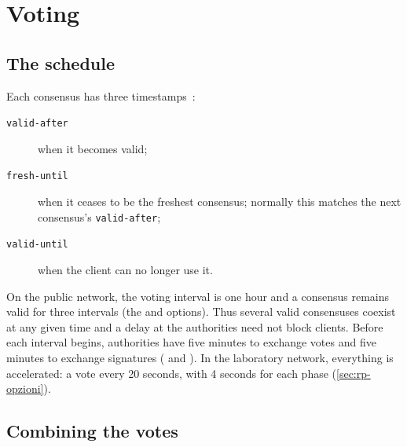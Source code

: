 \section{Voting}\label{sec:dir-voto}

\subsection{The schedule}

Each consensus has three timestamps~:
\begin{description}
  \item[\texttt{valid-after}] when it becomes valid;
  \item[\texttt{fresh-until}] when it ceases to be the freshest consensus; normally this matches the next consensus's \texttt{valid-after};
  \item[\texttt{valid-until}] when the client can no longer use it.
\end{description}
On the public network, the voting interval is one hour and a consensus remains valid for three intervals (the  and  options). Thus several valid consensuses coexist at any given time and a delay at the authorities need not block clients. Before each interval begins, authorities have five minutes to exchange votes and five minutes to exchange signatures ( and ). In the laboratory network, everything is accelerated: a vote every 20 seconds, with 4 seconds for each phase (\cref{sec:rp-opzioni}).

\subsection{Combining the votes}

